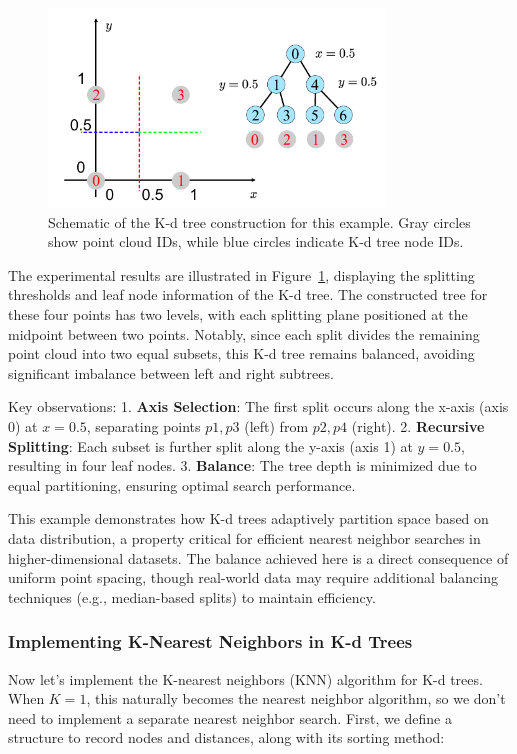 \begin{figure}[!htp]
	\centering
	\includegraphics[width=0.8\textwidth]{resources/basic-point-cloud/kdtree-example.pdf}
	\caption{Schematic of the K-d tree construction for this example. Gray circles show point cloud IDs, while blue circles indicate K-d tree node IDs.}
	\label{fig:kdtree-example}
\end{figure}

The experimental results are illustrated in Figure~\ref{fig:kdtree-example}, displaying the splitting thresholds and leaf node information of the K-d tree. The constructed tree for these four points has two levels, with each splitting plane positioned at the midpoint between two points. Notably, since each split divides the remaining point cloud into two equal subsets, this K-d tree remains balanced, avoiding significant imbalance between left and right subtrees.  

Key observations:
1. \textbf{Axis Selection}: The first split occurs along the x-axis (axis 0) at \( x = 0.5 \), separating points \( p1, p3 \) (left) from \( p2, p4 \) (right).  
2. \textbf{Recursive Splitting}: Each subset is further split along the y-axis (axis 1) at \( y = 0.5 \), resulting in four leaf nodes.  
3. \textbf{Balance}: The tree depth is minimized due to equal partitioning, ensuring optimal search performance.  

This example demonstrates how K-d trees adaptively partition space based on data distribution, a property critical for efficient nearest neighbor searches in higher-dimensional datasets. The balance achieved here is a direct consequence of uniform point spacing, though real-world data may require additional balancing techniques (e.g., median-based splits) to maintain efficiency.

\subsubsection{Implementing K-Nearest Neighbors in K-d Trees}
Now let's implement the K-nearest neighbors (KNN) algorithm for K-d trees. When \(K=1\), this naturally becomes the nearest neighbor algorithm, so we don't need to implement a separate nearest neighbor search. First, we define a structure to record nodes and distances, along with its sorting method:

